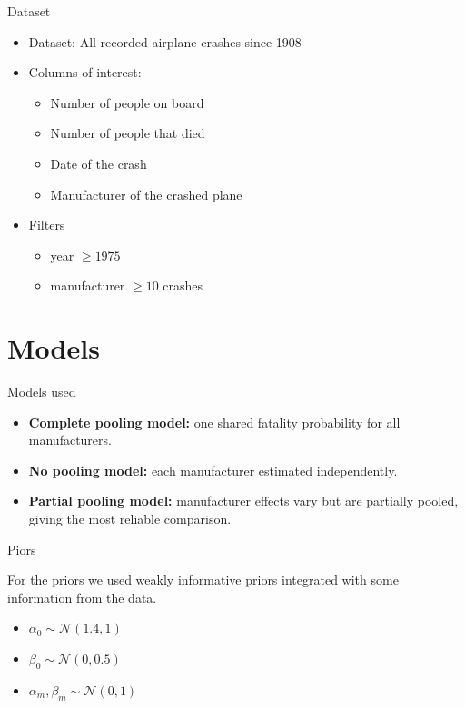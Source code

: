 \documentclass{beamer}
\begin{document}
\begin{frame}{Dataset}

    \begin{itemize}
        \item Dataset: All recorded airplane crashes since 1908 \cite{jogwums2023aircrashes}
        \item Columns of interest:
              \begin{itemize}
                  \item Number of people on board
                  \item Number of people that died
                  \item Date of the crash
                  \item Manufacturer of the crashed plane
              \end{itemize}
        \item Filters
              \begin{itemize}
                  \item year $\geq 1975$
                  \item manufacturer $\geq 10$ crashes
              \end{itemize}
    \end{itemize}


\end{frame}

\section{Models}

\begin{frame}{Models used}
    \begin{itemize}
        \item \textbf{Complete pooling model:} one shared fatality probability for all manufacturers.
        \item \textbf{No pooling model:} each manufacturer estimated independently.
        \item \textbf{Partial pooling model:} manufacturer effects vary but are partially pooled, giving the most reliable comparison.
    \end{itemize}
\end{frame}

\begin{frame}{Piors}

    For the priors we used weakly informative priors integrated with some information from the data.

    \begin{itemize}
        \item \(\alpha_0 \sim \mathcal{N}(1.4, 1)\)
        \item \(\beta_0 \sim \mathcal{N}(0, 0.5)\)
        \item \(\alpha_m,\beta_m \sim \mathcal{N}(0, 1)\)
    \end{itemize}


\end{frame}
\end{document}
